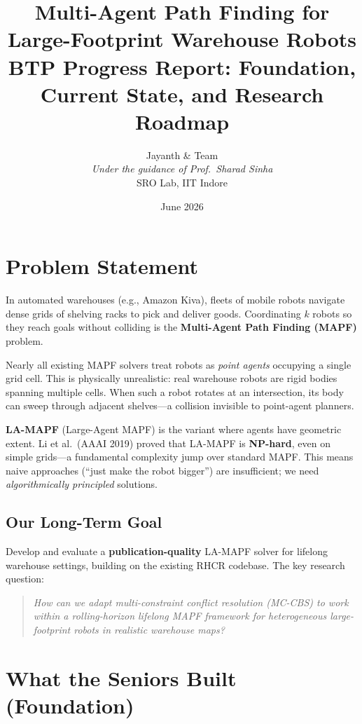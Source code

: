 \documentclass[12pt, a4paper]{article}
\title{
    \textbf{Multi-Agent Path Finding for Large-Footprint Warehouse Robots}\\[0.5em]
    \large BTP Progress Report: Foundation, Current State, and Research Roadmap
}
\author{
    Jayanth \& Team\\
    \textit{Under the guidance of Prof.\ Sharad Sinha}\\
    SRO Lab, IIT Indore
}
\date{June 2026}
\begin{document}
\maketitle
\tableofcontents
\newpage

\section{Problem Statement}

In automated warehouses (e.g., Amazon Kiva), fleets of mobile robots navigate dense grids of shelving racks to pick and deliver goods. Coordinating $k$ robots so they reach goals without colliding is the \textbf{Multi-Agent Path Finding (MAPF)} problem.

Nearly all existing MAPF solvers treat robots as \emph{point agents} occupying a single grid cell. This is physically unrealistic: real warehouse robots are rigid bodies spanning multiple cells. When such a robot rotates at an intersection, its body can sweep through adjacent shelves---a collision invisible to point-agent planners.

\textbf{LA-MAPF} (Large-Agent MAPF) is the variant where agents have geometric extent. Li et al.\ (AAAI 2019) proved that LA-MAPF is \textbf{NP-hard}, even on simple grids---a fundamental complexity jump over standard MAPF. This means naive approaches (``just make the robot bigger'') are insufficient; we need \emph{algorithmically principled} solutions.

\subsection{Our Long-Term Goal}

Develop and evaluate a \textbf{publication-quality} LA-MAPF solver for lifelong warehouse settings, building on the existing RHCR codebase. The key research question:

\begin{quote}
\textit{How can we adapt multi-constraint conflict resolution (MC-CBS) to work within a rolling-horizon lifelong MAPF framework for heterogeneous large-footprint robots in realistic warehouse maps?}
\end{quote}

\section{What the Seniors Built (Foundation)}
\label{sec:seniors}
\end{document}
